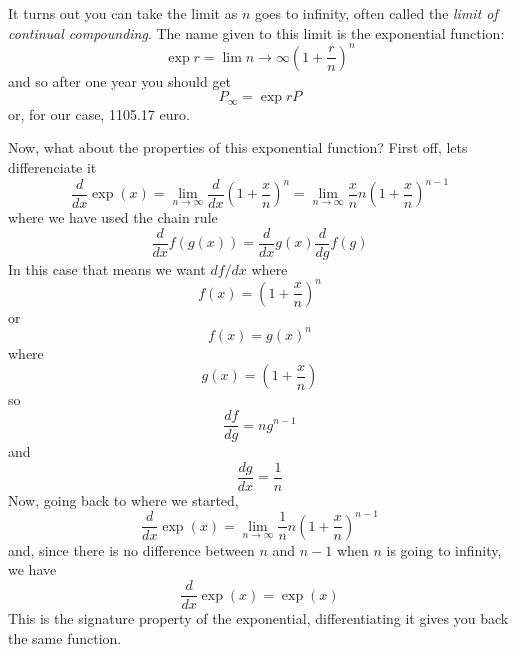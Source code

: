 \documentclass[12pt]{article}
\begin{document}
It turns out you can take the limit as $n$ goes to infinity, often
called the \textsl{limit of continual compounding}. The name given to
this limit is the exponential function:
\begin{equation}
\exp{r}=\lim{n\rightarrow \infty}\left(1+\frac{r}{n}\right)^n
\end{equation}
and so after one year you should get
\begin{equation}
P_\infty=\exp{r}P
\end{equation}
or, for our case, 1105.17 euro.

Now, what about the properties of this exponential function? First
off, lets differenciate it
\begin{equation}
\frac{d}{dx}\exp{(x)}=\lim_{n\rightarrow \infty}\frac{d}{dx}\left(1+\frac{x}{n}\right)^n=\lim_{n\rightarrow \infty}\frac{x}{n}n\left(1+\frac{x}{n}\right)^{n-1}
\end{equation}
where we have used the chain rule
\begin{equation}
\frac{d}{dx}f(g(x))=\frac{d}{dx}g(x)\frac{d}{dg}f(g)
\end{equation}
In this case that means we want $df/dx$ where 
\begin{equation}
f(x)=\left(1+\frac{x}{n}\right)^n
\end{equation}
or
\begin{equation}
f(x)=g(x)^n
\end{equation}
where
\begin{equation}
g(x)=\left(1+\frac{x}{n}\right)
\end{equation}
so 
\begin{equation}
\frac{df}{dg}=ng^{n-1}
\end{equation}
and
\begin{equation}
\frac{dg}{dx}=\frac{1}{n}
\end{equation}
Now, going back to where we started, 
\begin{equation}
\frac{d}{dx}\exp{(x)}=\lim_{n\rightarrow \infty}\frac{1}{n}n\left(1+\frac{x}{n}\right)^{n-1}
\end{equation}
and, since there is no difference between $n$ and $n-1$ when $n$ is going to infinity, we have
\begin{equation}
\frac{d}{dx}\exp(x)=\exp(x)
\end{equation}
This is the signature property of the exponential, differentiating it
gives you back the same function.
\end{document}
